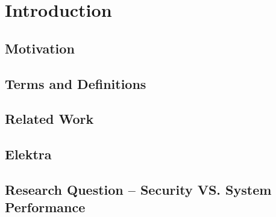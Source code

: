 \chapter{Introduction}

\section{Motivation}

\section{Terms and Definitions}

\section{Related Work}

\section{Elektra}

\section{Research Question -- Security VS. System Performance}